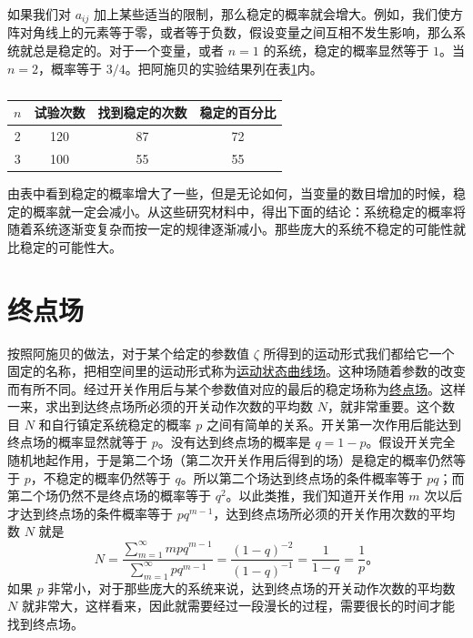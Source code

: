 如果我们对 $a_{ij}$ 加上某些适当的限制，那么稳定的概率就会增大。例如，我们使方阵对角线上的元素等于零，或者等于负数，假设变量之间互相不发生影响，那么系统就总是稳定的。对于一个变量，或者 $n=1$ 的系统，稳定的概率显然等于 $1$。当 $n=2$，概率等于 $3/4$。把阿施贝的实验结果列在表\ref{table_17_2}内。

\begin{table}
\centering
\caption{}     
\label{table_17_2}
\begin{tabular}{cccc}
\toprule
$n$ & 试验次数 & 找到稳定的次数 & 稳定的百分比 \\
\midrule
2 & 120 & 87 & 72 \\
3 & 100 & 55 & 55 \\
\bottomrule
\end{tabular}
\end{table}

由表中看到稳定的概率增大了一些，但是无论如何，当变量的数目增加的时候，稳定的概率就一定会减小。从这些研究材料中，得出下面的结论：系统稳定的概率将随着系统逐渐变复杂而按一定的规律逐渐减小。那些庞大的系统不稳定的可能性就比稳定的可能性大。

\section{终点场}

按照阿施贝的做法，对于某个给定的参数值 $\zeta$ 所得到的运动形式我们都给它一个固定的名称，把相空间里的运动形式称为\underline{运动状态曲线场}。这种场随着参数的改变而有所不同。经过开关作用后与某个参数值对应的最后的稳定场称为\underline{终点场}。这样一来，求出到达终点场所必须的开关动作次数的平均数 $N$，就非常重要。这个数目 $N$ 和自行镇定系统稳定的概率 $p$ 之间有简单的关系。开关第一次作用后能达到终点场的概率显然就等于 $p$。没有达到终点场的概率是 $q=1-p$。假设开关完全随机地起作用，于是第二个场（第二次开关作用后得到的场）是稳定的概率仍然等于 $p$，不稳定的概率仍然等于 $q$。所以第二个场达到终点场的条件概率等于 $pq$；而第二个场仍然不是终点场的概率等于 $q^2$。以此类推，我们知道开关作用 $m$ 次以后才达到终点场的条件概率等于 $pq^{m-1}$，达到终点场所必须的开关作用次数的平均数 $N$ 就是
\begin{equation}
N = \frac{\sum_{m=1}^{\infty} m p q^{m-1}}{\sum_{m=1}^{\infty} p q^{m-1}}
= \frac{(1-q)^{-2}}{(1-q)^{-1}}
= \frac{1}{1-q}
= \frac{1}{p}。
\label{eq:ch17_mean_switch_count_to_endpoint}
\end{equation}
如果 $p$ 非常小，对于那些庞大的系统来说，达到终点场的开关动作次数的平均数 $N$ 就非常大，这样看来，因此就需要经过一段漫长的过程，需要很长的时间才能找到终点场。

